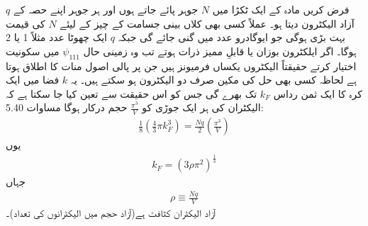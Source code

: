  
	فرض کریں مادہ کے ایک ٹکڑا میں $N$ جوہر پائے جاتے ہوں اور ہر جوہر اپنے حصہ کے $q$ آزاد الیکٹرون دیتا ہو۔ عملاً کسی بھی کلاں بینی جسامت کے چیز کے لیئے $N$ کی قیمت بہت بڑی ہوگی جو ایوگادرو عدد میں گنی جائے گی جبکہ $q$ ایک چھوٹا عدد مثلاً 1 یا 2 ہوگا۔ اگر ایلکٹرون بوزان یا قابلِ ممیز ذرات ہوتے تب وہ زمینی حال $\psi_{111}$ میں سکونیت اختیار کرتے حقیقتاً الیکٹروں یکساں فرمیونز ہیں جن پر پالی اصول منات کا اطلاق ہوتا ہے لحاظہ کسی بھی حل کی مکین صرف دو الیکٹرون ہو سکتے ہیں۔ یہ $k$ فضا میں ایک کرہ کا ایک ثمن رداس $k_F$ تک بھرے گی جس کو اس حقیقت سے تعین کیا جا سکتا ہے کہ الیکٹران کی ہر ایک جوڑی کو \(\frac{\pi^{3}}{V}\) حجم درکار ہوگا مساوات  \num{5.40}: 
	\begin{align*}
		\frac{1}{8}(\frac{4}{3} \pi k^{3}_F) =  \frac{Nq}{2}(\frac{\pi^3}{V})
	\end{align*}
یوں
\begin{align}
	k_F =(3\rho\pi^{2})^{\frac{1}{3}}
\end{align}
جہاں
\begin{align}
	\rho \equiv \frac{Nq}{V}
\end{align}
آزاد الیکٹران کثافت ہے(آزاد حجم میں الیکٹرانوں کی تعداد)۔

